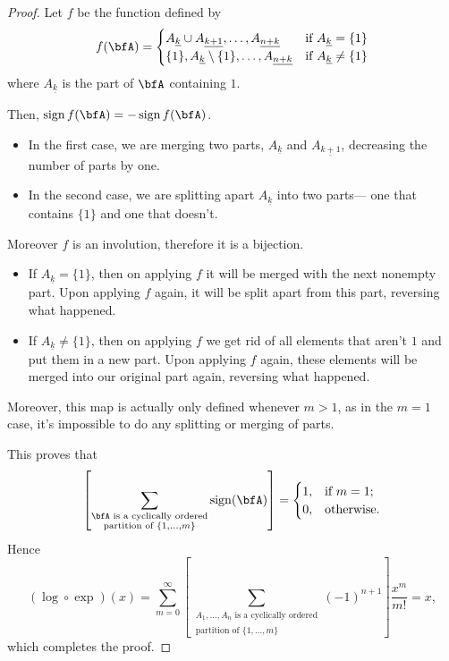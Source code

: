 \documentclass{article}
\DeclareMathOperator{\sign}{sign}
\begin{document}
\begin{proof}
    Let $f$ be the function defined by
    \[
        f(\bfA)
        =
        \begin{cases}
            A_{\underline{k}} \cup A_{\underline{k+1}}, \ldots, A_{\underline{n+k}}
            & \text{if } A_{\underline{k}} = \{1\} \\
            \{1\}, A_{\underline{k}} \setminus \{1\}, \ldots, A_{\underline{n+k}}
            & \text{if } A_{\underline{k}} \neq \{1\} \\
        \end{cases}
    \]
    where $A_{\underline{k}}$ is the part of $\bfA$ containing $1$. 

    Then, $\sign f(\bfA) = -\sign f(\bfA)$.
    \begin{itemize}
        \item
            In the first case, we are merging two parts, $A_{\underline{k}}$ and $A_{\underline{k+1}}$, decreasing the number of parts by one.
        \item 
            In the second case, we are splitting apart $A_{\underline{k}}$ into two parts--- one that contains $\{1\}$ and one that doesn't.
    \end{itemize}

    Moreover $f$ is an involution, therefore it is a bijection.
    \begin{itemize}
        \item
            If $A_{\underline{k}} = \{1\}$, then on applying $f$ it will be merged with the next nonempty part.
            Upon applying $f$ again, it will be split apart from this part, reversing what happened.
        \item 
            If $A_{\underline{k}} \neq \{1\}$, then on applying $f$ we get rid of all elements that aren't $1$ and put them in a new part.
            Upon applying $f$ again, these elements will be merged into our original part again, reversing what happened.
    \end{itemize}

    Moreover, this map is actually only defined whenever $m > 1$, as in the $m = 1$ case, it's impossible to do any splitting or merging of parts.

    This proves that
    \[
        \left[
            \sum_{
                \substack{
                    \bfA \text{ is a cyclically ordered} \\
                    \text{partition of }\{1,\ldots,m\}
                }
            }
            \sign(\bfA)
        \right]
        =
        \begin{cases}
            1, & \text{if } m=1; \\
            0, & \text{otherwise}.
        \end{cases}
    \]
    Hence
    \[
        (\log \circ \exp)(x)
        =
        \sum_{m=0}^\infty
        \left[
            \sum_{
                \substack{
                    A_{\underline{1}},\ldots,A_{\underline{n}} \text{ is a cyclically ordered} \\
                    \text{partition of }\{1,\ldots,m\}
                }
            }
            (-1)^{n+1}
        \right]
        \frac{x^m}{m!}
        =
        x,
    \]
    which completes the proof.
\end{proof}
\end{document}
